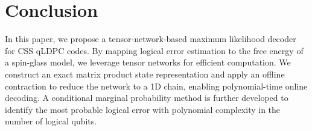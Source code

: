 \section{Conclusion}

In this paper, we propose a tensor-network-based maximum likelihood decoder for CSS qLDPC codes. By mapping logical error estimation to the free energy of a spin-glass model, we leverage tensor networks for efficient computation. We construct an exact matrix product state representation and apply an offline contraction to reduce the network to a 1D chain, enabling polynomial-time online decoding. A conditional marginal probability method is further developed to identify the most probable logical error with polynomial complexity in the number of logical qubits.